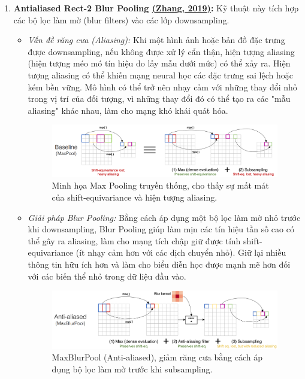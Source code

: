 \begin{enumerate}
\item \textbf{Antialiased Rect-2 Blur Pooling \hyperref[anti-aliased]{(Zhang, 2019)}:} Kỹ thuật này tích hợp các bộ lọc làm mờ (blur filters) vào các lớp downsampling.
\begin{itemize}
\item \textit{Vấn đề răng cưa (Aliasing):} Khi một hình ảnh hoặc bản đồ đặc trưng được downsampling, nếu không được xử lý cẩn thận, hiện tượng aliasing (hiện tượng méo mó tín hiệu do lấy mẫu dưới mức) có thể xảy ra. Hiện tượng aliasing có thể khiến mạng neural học các đặc trưng sai lệch hoặc kém bền vững. Mô hình có thể trở nên nhạy cảm với những thay đổi nhỏ trong vị trí của đối tượng, vì những thay đổi đó có thể tạo ra các "mẫu aliasing" khác nhau, làm cho mạng khó khái quát hóa.
    \begin{figure}[H]
    \centering
        \includegraphics[width=1.0\textwidth]{img/03-maxpool.png}
        \captionsetup{width=0.6\textwidth}
        \caption{Minh họa Max Pooling truyền thống, cho thấy sự mất mát của shift-equivariance và hiện tượng aliasing.}
        \label{fig:maxpool}
    \end{figure}
\item \textit{Giải pháp Blur Pooling:} Bằng cách áp dụng một bộ lọc làm mờ nhỏ trước khi downsampling, Blur Pooling giúp làm mịn các tín hiệu tần số cao có thể gây ra aliasing, làm cho mạng tích chập giữ được tính shift-equivariance (ít nhạy cảm hơn với các dịch chuyển nhỏ). Giữ lại nhiều thông tin hữu ích hơn và làm cho biểu diễn học được mạnh mẽ hơn đối với các biến thể nhỏ trong dữ liệu đầu vào.
    \begin{figure}[H]
    \centering
        \includegraphics[width=1.0\textwidth]{img/03-blur_pooling.png}
        \captionsetup{width=0.6\textwidth}
        \caption{MaxBlurPool (Anti-aliased), giảm răng cưa bằng cách áp dụng bộ lọc làm mờ trước khi subsampling.}
        \label{fig:blur_pooling}
    \end{figure}
\end{itemize}


\end{enumerate}
